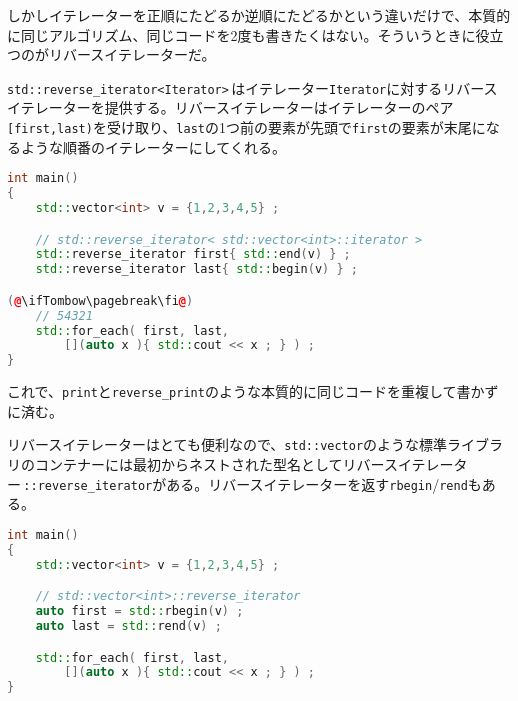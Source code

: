 しかしイテレーターを正順にたどるか逆順にたどるかという違いだけで、本質的に同じアルゴリズム、同じコードを2度も書きたくはない。そういうときに役立つのがリバースイテレーターだ。

\texttt{std::reverse\_iterator<Iterator>}\,はイテレーター\texttt{Iterator}に対するリバースイテレーターを提供する。リバースイテレーターはイテレーターのペア \texttt{[first,last)}を受け取り、\texttt{last}の1つ前の要素が先頭で\texttt{first}の要素が末尾になるような順番のイテレーターにしてくれる。

\begin{lstlisting}[language={C++}]
int main()
{
    std::vector<int> v = {1,2,3,4,5} ;

    // std::reverse_iterator< std::vector<int>::iterator >
    std::reverse_iterator first{ std::end(v) } ;
    std::reverse_iterator last{ std::begin(v) } ;

(@\ifTombow\pagebreak\fi@)
    // 54321
    std::for_each( first, last,
        [](auto x ){ std::cout << x ; } ) ;
}
\end{lstlisting}

これで、\texttt{print}と\texttt{reverse\_print}のような本質的に同じコードを重複して書かずに済む。

リバースイテレーターはとても便利なので、\texttt{std::vector}のような標準ライブラリのコンテナーには最初からネストされた型名としてリバースイテレーター\,\texttt{::reverse\_iterator}がある。リバースイテレーターを返す\texttt{rbegin}/\texttt{rend}もある。

\begin{lstlisting}[language={C++}]
int main()
{
    std::vector<int> v = {1,2,3,4,5} ;

    // std::vector<int>::reverse_iterator
    auto first = std::rbegin(v) ;
    auto last = std::rend(v) ;

    std::for_each( first, last,
        [](auto x ){ std::cout << x ; } ) ;
}
\end{lstlisting}

